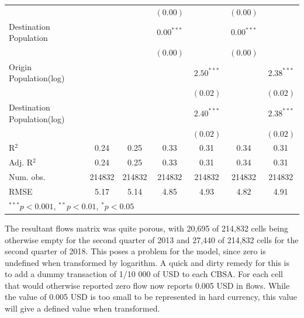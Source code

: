 \begin{table}
\begin{center}
\begin{tabular}{l c c c c c c }
			&               &               & $(0.00)$      &                & $(0.00)$      &                \\
			Destination Population      &               &               & $0.00^{***}$  &                & $0.00^{***}$  &                \\
			&               &               & $(0.00)$      &                & $(0.00)$      &                \\
			Origin Population(log)      &               &               &               & $2.50^{***}$   &               & $2.38^{***}$   \\
			&               &               &               & $(0.02)$       &               & $(0.02)$       \\
			Destination Population(log) &               &               &               & $2.40^{***}$   &               & $2.38^{***}$   \\
			&               &               &               & $(0.02)$       &               & $(0.02)$       \\
			\hline
			R$^2$                        & 0.24          & 0.25          & 0.33          & 0.31           & 0.34          & 0.31           \\
			Adj. R$^2$                   & 0.24          & 0.25          & 0.33          & 0.31           & 0.34          & 0.31           \\
			Num. obs.                    & 214832        & 214832        & 214832        & 214832         & 214832        & 214832         \\
			RMSE                         & 5.17          & 5.14          & 4.85          & 4.93           & 4.82          & 4.91           \\
			\hline
			\multicolumn{7}{l}{\scriptsize{$^{***}p<0.001$, $^{**}p<0.01$, $^*p<0.05$}}
		\end{tabular}
		
		\label{table:coefficients_gravity_2013Q2}
	\end{center}
\end{table}

The resultant flows matrix was quite porous, with 20,695 of 214,832 cells being otherwise empty for the second quarter of 2013 and  27,440 of 214,832 cells for the second quarter of 2018.  This poses a problem for the model, since zero is undefined when transformed by logarithm.  A quick and dirty remedy for this is to add a dummy transaction of 1/10 000 of USD to each CBSA.  For each cell that would otherwise reported zero flow now reports 0.005 USD in flows.  While the value of 0.005 USD is too small to be represented in hard currency, this value will give a defined value when transformed.  

